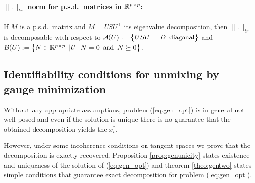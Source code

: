 \documentclass{article}
\begin{document}
\paragraph{$\|.\|_{tr}$ norm for p.s.d.\ matrices in $\mathbb{R}^{p\times p}$: } If $M$ is a p.s.d.\ matrix and $M=USU^{\top}$ its eigenvalue decomposition, then $\|.\|_{tr}$ is decomposable with respect to $\mathcal{A}(U):=\left\lbrace USU^{\top} \enskip | D \enskip \text{diagonal}\right\rbrace$ and $\mathcal{B}(U):=\left\lbrace N\in\mathbb{R}^{p\times p} \enskip | U^{\top}N=0 \enskip \text{and} \enskip N \succeq 0\right\rbrace$.\\



\subsection{Identifiability conditions for unmixing by gauge minimization}



Without any appropriate assumptions, problem (\ref{eq:gen_opt}) is in general not well posed and even if the solution is unique there is no guarantee that the obtained decomposition yields the $x_i^*$.

However, under some incoherence conditions on tangent spaces we prove that the decomposition is exactly recovered. Proposition \ref{prop:genunicity} states existence and uniqueness  of the solution of (\ref{eq:gen_opt}) and theorem \ref{theo:gentwo} states simple conditions that guarantee exact decomposition for problem  (\ref{eq:gen_opt}). %
\end{document}
